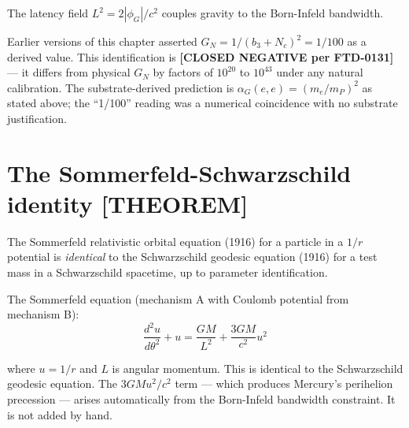 \documentclass[
  11pt,
  letterpaper,
  twoside,
  openany]{book}
\makeatletter
\let\orig@section\section
\renewcommand{\section}{\needspace{8\baselineskip}\orig@section}
\makeatother
\begin{document}
The latency field \(L^2 = 2|\phi_G|/c^2\) couples gravity to the
Born-Infeld bandwidth.

\begin{tcolorbox}[enhanced jigsaw, colbacktitle=quarto-callout-warning-color!10!white, titlerule=0mm, bottomtitle=1mm, bottomrule=.15mm, colback=white, arc=.35mm, breakable, toprule=.15mm, title=\textcolor{quarto-callout-warning-color}{\faExclamationTriangle}\hspace{0.5em}{Retraction (2026-05-08)}, rightrule=.15mm, coltitle=black, leftrule=.75mm, colframe=quarto-callout-warning-color-frame, toptitle=1mm, opacityback=0, opacitybacktitle=0.6, left=2mm]

Earlier versions of this chapter asserted
\(G_N = 1/(b_3+N_c)^2 = 1/100\) as a derived value. This identification
is \textbf{{[}CLOSED NEGATIVE per FTD-0131{]}} --- it differs from
physical \(G_N\) by factors of \(10^{20}\) to \(10^{43}\) under any
natural calibration. The substrate-derived prediction is
\(\alpha_G(e,e) = (m_e/m_P)^2\) as stated above; the ``1/100'' reading
was a numerical coincidence with no substrate justification.

\end{tcolorbox}

\section{The Sommerfeld-Schwarzschild identity
{[}THEOREM{]}}\label{the-sommerfeld-schwarzschild-identity-theorem}

\begin{ftdtheorem}[Theorem 15.1]

The Sommerfeld relativistic orbital equation (1916) for a particle in a
\(1/r\) potential is \emph{identical} to the Schwarzschild geodesic
equation (1916) for a test mass in a Schwarzschild spacetime, up to
parameter identification.

\end{ftdtheorem}

The Sommerfeld equation (mechanism A with Coulomb potential from
mechanism B): \[
\frac{d^2 u}{d\theta^2} + u = \frac{GM}{L^2} + \frac{3GM}{c^2} u^2
\tag{15.4}
\]

where \(u = 1/r\) and \(L\) is angular momentum. This is identical to
the Schwarzschild geodesic equation. The \(3GM u^2/c^2\) term --- which
produces Mercury's perihelion precession --- arises automatically from
the Born-Infeld bandwidth constraint. It is not added by hand.
\end{document}
